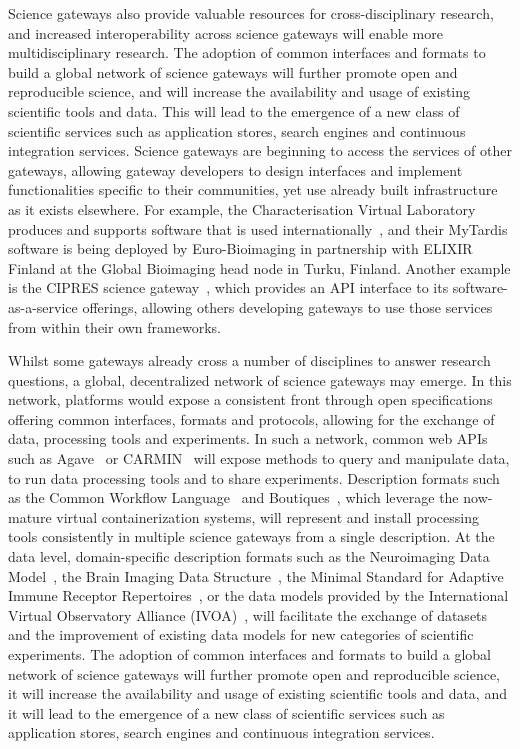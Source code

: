 \documentclass[review]{elsarticle}
\begin{document}
Science gateways also provide valuable resources for cross-disciplinary research, and increased interoperability across science gateways will enable more multidisciplinary research. The adoption of common interfaces and formats to build a global network of science gateways will further promote open and reproducible science, and will increase the availability and usage of existing scientific tools and data. This will lead to the emergence of a new class of scientific services such as application stores, search engines and continuous integration services. 
Science gateways are beginning to access the services of other gateways, allowing gateway developers to design interfaces and implement functionalities specific to their communities, yet use already built infrastructure as it exists elsewhere. 
For example, the Characterisation Virtual Laboratory produces and supports software that is used internationally~\cite{cvl}, and their MyTardis software is being deployed by Euro-Bioimaging in partnership with ELIXIR Finland at the Global Bioimaging head node in Turku, Finland. 
Another example is the CIPRES science gateway~\cite{Miller2012-40}, which provides an API interface to its software-as-a-service offerings, allowing others developing gateways to use those services from within their own frameworks.

Whilst some gateways already cross a number of disciplines to answer research questions, a global, decentralized network of science gateways may emerge. In this network, platforms would expose a consistent front through open specifications offering common interfaces, formats and protocols, allowing for the exchange of data, processing tools and experiments. In such a network, common web APIs such as Agave~\cite{agave-8} or CARMIN~\cite{carmin-9} will expose methods to query and manipulate data, to run data processing tools and to share experiments. Description formats such as the Common Workflow Language~\cite{cwl-10} and Boutiques~\cite{boutiques-11}, which leverage the now-mature virtual containerization systems, will represent and install processing tools consistently in multiple science gateways from a single description. At the data level, domain-specific description formats such as the Neuroimaging Data Model~\cite{nidm-12}, the Brain Imaging Data Structure~\cite{bids-13}, the Minimal Standard for Adaptive Immune Receptor Repertoires~\cite{rubelt-82,Breden-83}, or the data models provided by the International Virtual Observatory Alliance (IVOA)~\cite{ivoa-14}, will facilitate the exchange of datasets and the improvement of existing data models for new categories of scientific experiments. The adoption of common interfaces and formats to build a global network of science gateways will further promote open and reproducible science, it will increase the availability and usage of existing scientific tools and data, and it will lead to the emergence of a new class of scientific services such as application stores, search engines and continuous integration services.
\end{document}
